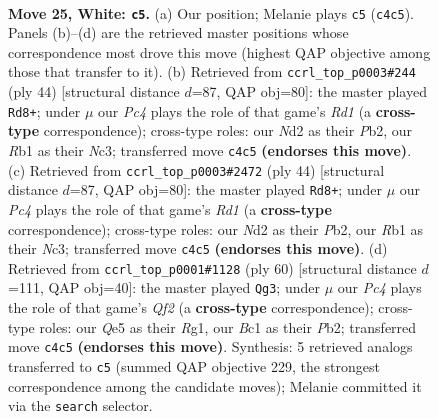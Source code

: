 \documentclass[11pt]{article}
\begin{document}
\clearpage

\begin{figure}[p]\centering
\begin{subfigure}{0.46\textwidth}\centering
\resizebox{\linewidth}{!}{%
\newchessgame
\chessboard[
  setfen={7r/1b3pk1/2p2rp1/p3Q2p/B1P4P/3q4/PP1N2P1/1RB3K1 w - - 2 25},
  showmover=false,
  pgfstyle=straightmove, color=movearrow, markmove={c4-c5}
]}
\caption{}
\end{subfigure}\hfill
\begin{subfigure}{0.46\textwidth}\centering
\resizebox{\linewidth}{!}{%
\newchessgame
\chessboard[
  setfen={r6k/1p3prp/p3bQ2/2q1p3/P3P3/2N5/1PP1B1PP/3R3K w - - 3 23},
  showmover=false,
  pgfstyle=straightmove, color=movearrow, markmove={d1-d8}
]}
\caption{}
\end{subfigure}
\\[4pt]
\begin{subfigure}{0.46\textwidth}\centering
\resizebox{\linewidth}{!}{%
\newchessgame
\chessboard[
  setfen={r6k/1p3prp/p3bQ2/2q1p3/P3P3/2N5/1PP1B1PP/3R3K w - - 7 23},
  showmover=false,
  pgfstyle=straightmove, color=movearrow, markmove={d1-d8}
]}
\caption{}
\end{subfigure}\hfill
\begin{subfigure}{0.46\textwidth}\centering
\resizebox{\linewidth}{!}{%
\newchessgame
\chessboard[
  setfen={2bb3k/1r3prP/p2Bp1p1/3q4/1P2N3/3B4/1PP2Q2/1K4R1 w - - 1 31},
  showmover=false,
  pgfstyle=straightmove, color=movearrow, markmove={f2-g3}
]}
\caption{}
\end{subfigure}
\caption{\textbf{Move 25, White: \texttt{c5}.} (a) Our position; Melanie plays \texttt{c5} (\texttt{c4c5}). Panels (b)--(d) are the retrieved master positions whose correspondence most drove this move (highest QAP objective among those that transfer to it). (b) Retrieved from \texttt{ccrl\_top\_p0003\#244} (ply 44) [structural distance $d$=87, QAP obj=80]: the master played \texttt{Rd8+}; under $\mu$ our \emph{Pc4} plays the role of that game's \emph{Rd1} (a \textbf{cross-type} correspondence); cross-type roles: our \emph{N}d2 as their \emph{P}b2, our \emph{R}b1 as their \emph{N}c3; transferred move \texttt{c4c5} \textbf{(endorses this move)}. (c) Retrieved from \texttt{ccrl\_top\_p0003\#2472} (ply 44) [structural distance $d$=87, QAP obj=80]: the master played \texttt{Rd8+}; under $\mu$ our \emph{Pc4} plays the role of that game's \emph{Rd1} (a \textbf{cross-type} correspondence); cross-type roles: our \emph{N}d2 as their \emph{P}b2, our \emph{R}b1 as their \emph{N}c3; transferred move \texttt{c4c5} \textbf{(endorses this move)}. (d) Retrieved from \texttt{ccrl\_top\_p0001\#1128} (ply 60) [structural distance $d$=111, QAP obj=40]: the master played \texttt{Qg3}; under $\mu$ our \emph{Pc4} plays the role of that game's \emph{Qf2} (a \textbf{cross-type} correspondence); cross-type roles: our \emph{Q}e5 as their \emph{R}g1, our \emph{B}c1 as their \emph{P}b2; transferred move \texttt{c4c5} \textbf{(endorses this move)}. Synthesis: 5 retrieved analogs transferred to \texttt{c5} (summed QAP objective 229, the strongest correspondence among the candidate moves); Melanie committed it via the \texttt{search} selector.}
\label{fig:thought-m48}
\end{figure}
\end{document}
